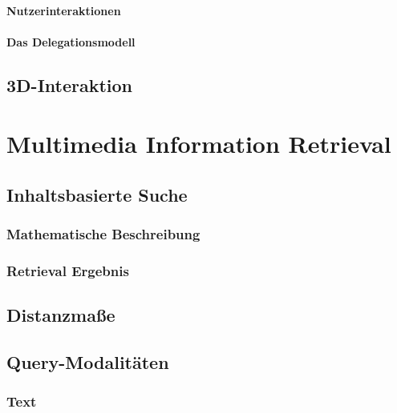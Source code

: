 \documentclass[a4paper, 11pt, accentcolor = tud3b]{tudreport}
\begin{document}
				\subsubsection{Nutzerinteraktionen} %

				\subsubsection{Das Delegationsmodell} %

		\section{3D-Interaktion} %

	\chapter{Multimedia Information Retrieval} %

		\section{Inhaltsbasierte Suche} %

			\subsection{Mathematische Beschreibung} %

			\subsection{Retrieval Ergebnis} %

		\section{Distanzmaße} %

		\section{Query-Modalitäten} %

			\subsection{Text} %
\end{document}

